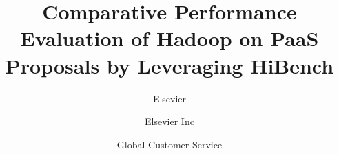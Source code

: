 \documentclass[review]{elsarticle}
\begin{document}
\begin{frontmatter}

\title{Comparative Performance Evaluation of Hadoop on PaaS Proposals by Leveraging HiBench}

\author{Elsevier}
\address{Radarweg 29, Amsterdam}

\author[mymainaddress,mysecondaryaddress]{Elsevier Inc}

\author[mysecondaryaddress]{Global Customer Service}

\address[mymainaddress]{1600 John F Kennedy Boulevard, Philadelphia}
\address[mysecondaryaddress]{360 Park Avenue South, New York}


\end{frontmatter}
\end{document}
